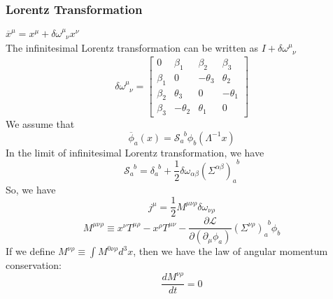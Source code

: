 \subsubsection{Lorentz Transformation}
$\overline{x}^{\mu} = x^{\mu} + \delta \omega^{\mu}_{\phantom{\mu}\nu} x^{\nu}$\\
The infinitesimal Lorentz transformation can be written as $I+\delta \omega^{\mu}_{\phantom{\mu}\nu}$
\[\delta \omega^{\mu}_{\phantom{\mu}\nu} = \left[ 
\begin{matrix} 
0       & \beta_1   & \beta_2   & \beta_3   \\ 
\beta_1 & 0         & -\theta_3 & \theta_2  \\
\beta_2 & \theta_3  & 0         & -\theta_1 \\
\beta_3 & -\theta_2 & \theta_1  & 0
\end{matrix} 
\right]\]
We assume that
\[\overline{\phi}_a(x) = \mathscr{S}_{a}^{\phantom{a}b}\phi_b(\Lambda^{-1}x)\]
In the limit of infinitesimal Lorentz transformation, we have
\[\mathscr{S}_{a}^{\phantom{a}b} = \delta_{a}^{\phantom{a}b}+\frac{1}{2} \delta \omega_{\alpha \beta} (\Sigma^{\alpha \beta})_{a}^{\phantom{a}b} \]
So, we have
\[j^{\mu} = \frac{1}{2} M^{\mu \nu \rho}  \delta \omega_{\nu \rho}\]
\[M^{\mu \nu \rho} \equiv x^{\nu}T^{\mu \rho} - x^{\rho} T^{\mu \nu} - \frac{\partial \mathcal{L}}{\partial (\partial_{\mu}\phi_a)}(\Sigma^{\nu \rho})_{a}^{\phantom{a}b}\phi_b\]
If we define $M^{\nu \rho} \equiv \int M^{0 \nu \rho} d^3 x$, then we have the law of angular momentum conservation:
\[\frac{dM^{\nu \rho}}{dt} = 0\]

